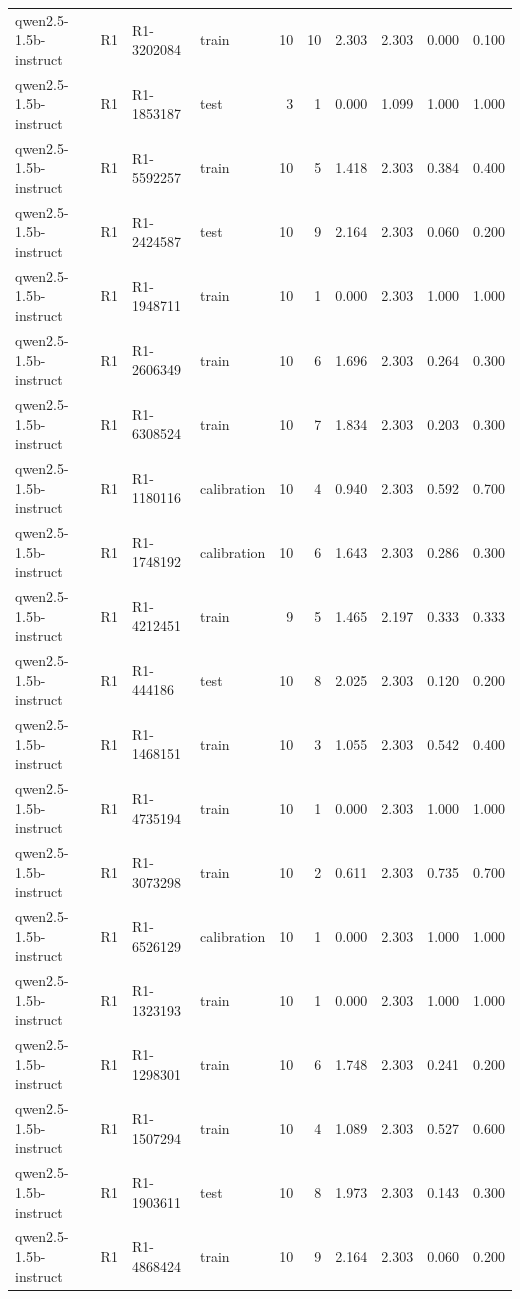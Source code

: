 \begin{table}
\begin{tabular}{llllrrrrrr}
qwen2.5-1.5b-instruct & R1 & R1-3202084 & train & 10 & 10 & 2.303 & 2.303 & 0.000 & 0.100 \\
qwen2.5-1.5b-instruct & R1 & R1-1853187 & test & 3 & 1 & 0.000 & 1.099 & 1.000 & 1.000 \\
qwen2.5-1.5b-instruct & R1 & R1-5592257 & train & 10 & 5 & 1.418 & 2.303 & 0.384 & 0.400 \\
qwen2.5-1.5b-instruct & R1 & R1-2424587 & test & 10 & 9 & 2.164 & 2.303 & 0.060 & 0.200 \\
qwen2.5-1.5b-instruct & R1 & R1-1948711 & train & 10 & 1 & 0.000 & 2.303 & 1.000 & 1.000 \\
qwen2.5-1.5b-instruct & R1 & R1-2606349 & train & 10 & 6 & 1.696 & 2.303 & 0.264 & 0.300 \\
qwen2.5-1.5b-instruct & R1 & R1-6308524 & train & 10 & 7 & 1.834 & 2.303 & 0.203 & 0.300 \\
qwen2.5-1.5b-instruct & R1 & R1-1180116 & calibration & 10 & 4 & 0.940 & 2.303 & 0.592 & 0.700 \\
qwen2.5-1.5b-instruct & R1 & R1-1748192 & calibration & 10 & 6 & 1.643 & 2.303 & 0.286 & 0.300 \\
qwen2.5-1.5b-instruct & R1 & R1-4212451 & train & 9 & 5 & 1.465 & 2.197 & 0.333 & 0.333 \\
qwen2.5-1.5b-instruct & R1 & R1-444186 & test & 10 & 8 & 2.025 & 2.303 & 0.120 & 0.200 \\
qwen2.5-1.5b-instruct & R1 & R1-1468151 & train & 10 & 3 & 1.055 & 2.303 & 0.542 & 0.400 \\
qwen2.5-1.5b-instruct & R1 & R1-4735194 & train & 10 & 1 & 0.000 & 2.303 & 1.000 & 1.000 \\
qwen2.5-1.5b-instruct & R1 & R1-3073298 & train & 10 & 2 & 0.611 & 2.303 & 0.735 & 0.700 \\
qwen2.5-1.5b-instruct & R1 & R1-6526129 & calibration & 10 & 1 & 0.000 & 2.303 & 1.000 & 1.000 \\
qwen2.5-1.5b-instruct & R1 & R1-1323193 & train & 10 & 1 & 0.000 & 2.303 & 1.000 & 1.000 \\
qwen2.5-1.5b-instruct & R1 & R1-1298301 & train & 10 & 6 & 1.748 & 2.303 & 0.241 & 0.200 \\
qwen2.5-1.5b-instruct & R1 & R1-1507294 & train & 10 & 4 & 1.089 & 2.303 & 0.527 & 0.600 \\
qwen2.5-1.5b-instruct & R1 & R1-1903611 & test & 10 & 8 & 1.973 & 2.303 & 0.143 & 0.300 \\
qwen2.5-1.5b-instruct & R1 & R1-4868424 & train & 10 & 9 & 2.164 & 2.303 & 0.060 & 0.200 \\

\end{tabular}
\end{table}
